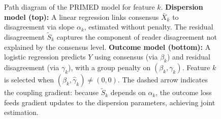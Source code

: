 \documentclass[referee,lineno,pdflatex,sn-vancouver-num]{sn-jnl}
\begin{document}
\begin{figure}[h]
\caption{Path diagram of the PRIMED model for feature $k$.
\textbf{Dispersion model (top):}
A linear regression links consensus $\bar X_k$ to disagreement via slope $\alpha_k$, estimated without penalty.
The residual disagreement $\tilde S_k$ captures the component of reader disagreement not explained by the consensus level.
\textbf{Outcome model (bottom):}
A logistic regression predicts $Y$ using consensus (via $\beta_k$) and residual disagreement (via $\gamma_k$), with a group penalty on $(\beta_k, \gamma_k)$.
Feature $k$ is selected when $(\hat\beta_k, \hat\gamma_k) \neq (0,0)$.
The dashed arrow indicates the coupling gradient: because $\tilde S_k$ depends on $\alpha_k$, the outcome loss feeds gradient updates to the dispersion parameters, achieving joint estimation.}\label{fig:path}
\end{figure}
\end{document}
